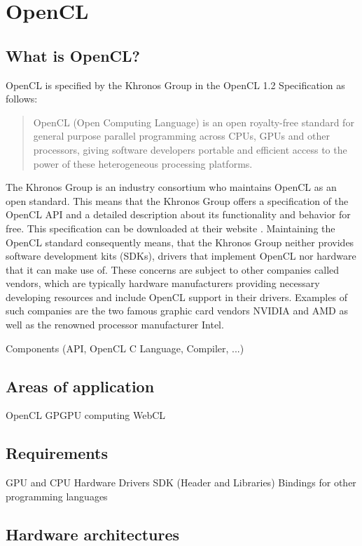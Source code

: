 \section{OpenCL}

\subsection{What is OpenCL?}
OpenCL is specified by the Khronos Group in the OpenCL 1.2 Specification as follows:

\begin{quotation}
OpenCL (Open Computing Language) is an open royalty-free standard for general purpose
parallel programming across CPUs, GPUs and other processors, giving software developers
portable and efficient access to the power of these heterogeneous processing platforms. \cite{opencl_spec}
\end{quotation}

The Khronos Group is an industry consortium who maintains OpenCL as an open standard. This means that the Khronos Group offers a specification of the OpenCL API and a detailed description about its functionality and behavior for free. This specification can be downloaded at their website \cite{opencl_spec}. Maintaining the OpenCL standard consequently means, that the Khronos Group neither provides software development kits (SDKs), drivers that implement OpenCL nor hardware that it can make use of. These concerns are subject to other companies called vendors, which are typically hardware manufacturers providing necessary developing resources and include OpenCL support in their drivers. Examples of such companies are the two famous graphic card vendors NVIDIA and AMD as well as the renowned processor manufacturer Intel.


Components (API, OpenCL C Language, Compiler, ...)

\subsection{Areas of application}
OpenCL
GPGPU computing
WebCL

\subsection{Requirements}
GPU and CPU Hardware
Drivers
SDK (Header and Libraries)
Bindings for other programming languages

\subsection{Hardware architectures}

